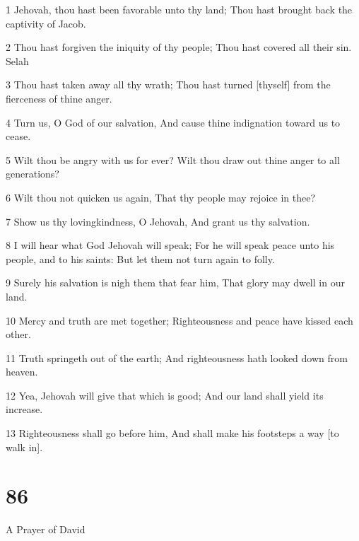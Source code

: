 \par 1 Jehovah, thou hast been favorable unto thy land; Thou hast brought back the captivity of Jacob.
\par 2 Thou hast forgiven the iniquity of thy people; Thou hast covered all their sin. Selah
\par 3 Thou hast taken away all thy wrath; Thou hast turned [thyself] from the fierceness of thine anger.
\par 4 Turn us, O God of our salvation, And cause thine indignation toward us to cease.
\par 5 Wilt thou be angry with us for ever? Wilt thou draw out thine anger to all generations?
\par 6 Wilt thou not quicken us again, That thy people may rejoice in thee?
\par 7 Show us thy lovingkindness, O Jehovah, And grant us thy salvation.
\par 8 I will hear what God Jehovah will speak; For he will speak peace unto his people, and to his saints: But let them not turn again to folly.
\par 9 Surely his salvation is nigh them that fear him, That glory may dwell in our land.
\par 10 Mercy and truth are met together; Righteousness and peace have kissed each other.
\par 11 Truth springeth out of the earth; And righteousness hath looked down from heaven.
\par 12 Yea, Jehovah will give that which is good; And our land shall yield its increase.
\par 13 Righteousness shall go before him, And shall make his footsteps a way [to walk in].

\chapter{86}

\par A Prayer of David

